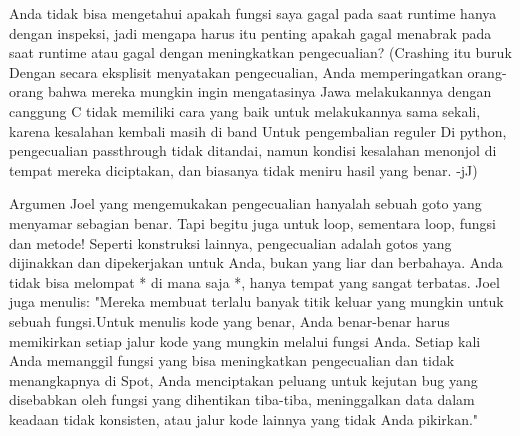 Anda tidak bisa mengetahui apakah fungsi saya gagal pada saat runtime hanya dengan inspeksi, jadi mengapa harus itu penting apakah gagal menabrak pada saat runtime atau gagal dengan meningkatkan pengecualian? 
(Crashing itu buruk Dengan secara eksplisit menyatakan pengecualian, Anda memperingatkan orang-orang bahwa mereka mungkin ingin mengatasinya Jawa melakukannya dengan canggung C tidak memiliki cara yang baik untuk melakukannya sama sekali, karena kesalahan kembali masih di band Untuk pengembalian reguler Di python, pengecualian passthrough tidak ditandai, namun kondisi kesalahan menonjol di tempat mereka diciptakan, dan biasanya tidak meniru hasil yang benar. -jJ)

Argumen Joel yang mengemukakan pengecualian hanyalah sebuah goto yang menyamar sebagian benar. Tapi begitu juga untuk loop, sementara loop, fungsi dan metode! Seperti konstruksi lainnya, pengecualian adalah gotos yang dijinakkan dan dipekerjakan untuk Anda, bukan yang liar dan berbahaya. Anda tidak bisa melompat * di mana saja *, hanya tempat yang sangat terbatas.
Joel juga menulis:
"Mereka membuat terlalu banyak titik keluar yang mungkin untuk sebuah fungsi.Untuk menulis kode yang benar, Anda benar-benar harus memikirkan setiap jalur kode yang mungkin melalui fungsi Anda. Setiap kali Anda memanggil fungsi yang bisa meningkatkan pengecualian dan tidak menangkapnya di Spot, Anda menciptakan peluang untuk kejutan bug yang disebabkan oleh fungsi yang dihentikan tiba-tiba, meninggalkan data dalam keadaan tidak konsisten, atau jalur kode lainnya yang tidak Anda pikirkan."
